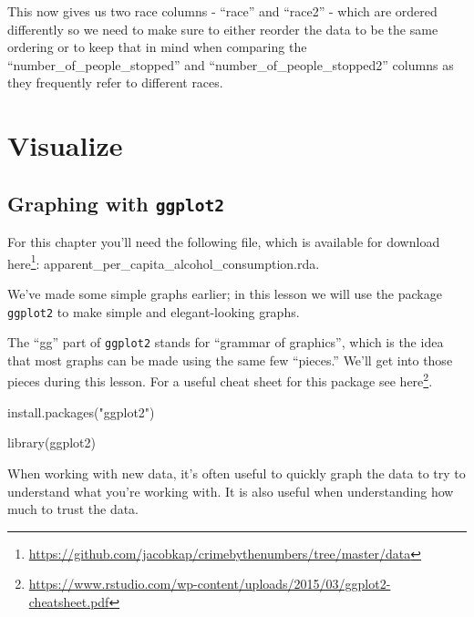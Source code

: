 \documentclass[
]{krantz}
\makeatletter
\newenvironment{Shaded}{\begin{snugshade}}{\end{snugshade}}
\newcommand{\FunctionTok}[1]{\textcolor[rgb]{0,0,0}{#1}}
\newcommand{\NormalTok}[1]{#1}
\newcommand{\StringTok}[1]{\textcolor[rgb]{0.5,0.5,0.5}{#1}}
\renewcommand{\href}[2]{#2\footnote{\url{#1}}}
\newenvironment{kframe}{%
\medskip{}
\setlength{\fboxsep}{.8em}
 \def\at@end@of@kframe{}%
 \ifinner\ifhmode%
  \def\at@end@of@kframe{\end{minipage}}%
  \begin{minipage}{\columnwidth}%
 \fi\fi%
 \def\FrameCommand##1{\hskip\@totalleftmargin \hskip-\fboxsep
 \colorbox{shadecolor}{##1}\hskip-\fboxsep
     \hskip-\linewidth \hskip-\@totalleftmargin \hskip\columnwidth}%
 \MakeFramed {\advance\hsize-\width
   \@totalleftmargin\z@ \linewidth\hsize
   \@setminipage}}%
 {\par\unskip\endMakeFramed%
 \at@end@of@kframe}
\renewenvironment{Shaded}{\begin{kframe}}{\end{kframe}}
\makeatother
\begin{document}
This now gives us two race columns - ``race'' and ``race2''
- which are ordered differently so we need to make sure to
either reorder the data to be the same ordering or to keep
that in mind when comparing the
``number\_of\_people\_stopped'' and
``number\_of\_people\_stopped2'' columns as they frequently
refer to different races.

\hypertarget{part-visualize}{%
\part{Visualize}\label{part-visualize}}

\hypertarget{graphing-intro}{%
\chapter{\texorpdfstring{Graphing with
\texttt{ggplot2}}{Graphing with ggplot2}}\label{graphing-intro}}

For this chapter you'll need the following file, which is
available for download
\href{https://github.com/jacobkap/crimebythenumbers/tree/master/data}{here}:
apparent\_per\_capita\_alcohol\_consumption.rda.

We've made some simple graphs earlier; in this lesson we
will use the package \texttt{ggplot2} to make simple and
elegant-looking graphs.

The ``gg'' part of \texttt{ggplot2} stands for ``grammar of
graphics'', which is the idea that most graphs can be made
using the same few ``pieces.'' We'll get into those pieces
during this lesson. For a useful cheat sheet for this
package see
\href{https://www.rstudio.com/wp-content/uploads/2015/03/ggplot2-cheatsheet.pdf}{here}.

\begin{Shaded}
\begin{Highlighting}[]
\FunctionTok{install.packages}\NormalTok{(}\StringTok{"ggplot2"}\NormalTok{)}
\end{Highlighting}
\end{Shaded}

\begin{Shaded}
\begin{Highlighting}[]
\FunctionTok{library}\NormalTok{(ggplot2)}
\end{Highlighting}
\end{Shaded}

When working with new data, it's often useful to quickly
graph the data to try to understand what you're working
with. It is also useful when understanding how much to trust
the data.
\end{document}
